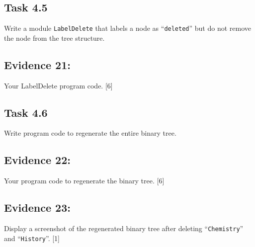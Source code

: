 \subsection*{Task 4.5 }

Write a module \texttt{LabelDelete} that labels a node as \textquotedblleft \texttt{deleted}\textquotedblright{}
but do not remove the node from the tree structure. 

\subsection*{Evidence 21: }

Your LabelDelete program code. \hfill{}{[}6{]}

\subsection*{Task 4.6}

Write program code to regenerate the entire binary tree.

\subsection*{Evidence 22: }

Your program code to regenerate the binary tree. \hfill{}{[}6{]}

\subsection*{Evidence 23:}

Display a screenshot of the regenerated binary tree after deleting
\textquotedblleft \texttt{Chemistry}\textquotedblright{} and \textquotedblleft \texttt{History}\textquotedblright .
\hfill{} {[}1{]}